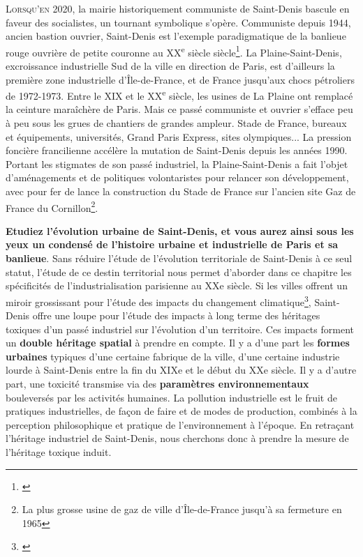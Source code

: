 \documentclass[a4paper,twoside,12pt]{book}
\newcommand{\siecle}[1]{\textsc{#1}\textsuperscript{e} siècle}
\begin{document}
\lettrine{L}{orsqu'en 2020,} la mairie historiquement communiste de Saint-Denis bascule en faveur des socialistes, un tournant symbolique s'opère. Communiste depuis 1944, ancien bastion ouvrier, Saint-Denis est l'exemple paradigmatique de la banlieue rouge ouvrière de petite couronne au \siecle{XX} siècle\footnote{\cite{brunet_saint-denis_1980}}. La Plaine-Saint-Denis, excroissance industrielle Sud de la ville en direction de Paris, est d'ailleurs la première zone industrielle d'Île-de-France, et de France jusqu'aux chocs pétroliers de 1972-1973. Entre le XIX et le \siecle{XX}, les usines de La Plaine ont remplacé la ceinture maraîchère de Paris. Mais ce passé communiste et ouvrier s'efface peu à peu sous les grues de chantiers de grandes ampleur. Stade de France, bureaux et équipements, universités, Grand Paris Express, sites olympiques... La pression foncière francilienne accélère la mutation de Saint-Denis depuis les années 1990.  Portant les stigmates de son passé industriel, la Plaine-Saint-Denis a fait l'objet d'aménagements et de politiques volontaristes pour relancer son développement, avec pour fer de lance la construction du Stade de France sur l'ancien site Gaz de France du Cornillon\footnote{La plus grosse usine de gaz de ville d'Île-de-France jusqu'à sa fermeture en 1965}. 

\textbf{Etudiez l'évolution urbaine de Saint-Denis, et vous aurez ainsi sous les yeux un condensé de l'histoire urbaine et industrielle de Paris et sa banlieue}. Sans réduire l'étude de l'évolution territoriale de Saint-Denis à ce seul statut, l'étude de ce destin territorial nous permet d'aborder dans ce chapitre les spécificités de l'industrialisation parisienne au XXe siècle. Si les villes offrent un miroir grossissant pour l'étude des impacts du changement climatique\footnote{\cite{barles_lurbain_2020}}, Saint-Denis offre une loupe pour l'étude des impacts à long terme des héritages toxiques d'un passé industriel sur l'évolution d'un territoire. Ces impacts forment un \textbf{double héritage spatial} à prendre en compte. Il y a d'une part les \textbf{formes urbaines} typiques d'une certaine fabrique de la ville, d'une certaine industrie lourde à Saint-Denis entre la fin du XIXe et le début du XXe siècle. Il y a d'autre part, une toxicité transmise via des \textbf{paramètres environnementaux} bouleversés par les activités humaines. La pollution industrielle est le fruit de pratiques industrielles, de façon de faire et de modes de production, combinés à la perception philosophique et pratique de l'environnement à l'époque. En retraçant l'héritage industriel de Saint-Denis, nous cherchons donc à prendre la mesure de l'héritage toxique induit. 
\end{document}
